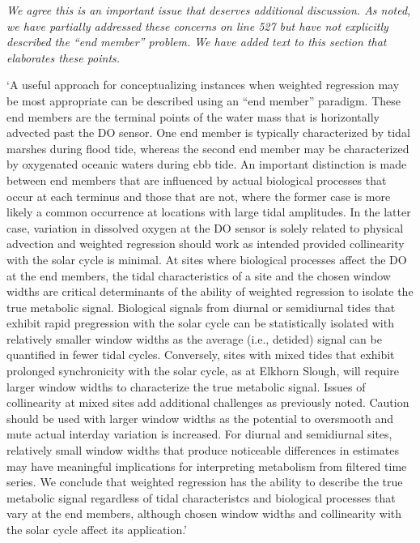 \documentclass[letterpaper,12pt]{article}\usepackage[]{graphicx}\usepackage[]{color}
\begin{document}
{\it We agree this is an important issue that deserves additional discussion.  As noted, we have partially addressed these concerns on line 527 but have not explicitly described the ``end member'' problem.  We have added text to this section that elaborates these points. 

`A useful approach for conceptualizing instances when weighted regression may be most appropriate can be described using an ``end member'' paradigm.  These end members are the terminal points of the water mass that is horizontally advected past the DO sensor.  One end member is typically characterized by tidal marshes during flood tide, whereas the second end member may be characterized by oxygenated oceanic waters during ebb tide.  An important distinction is made between end members that are influenced by actual biological processes that occur at each terminus and those that are not, where the former case is more likely a common occurrence at locations with large tidal amplitudes.  In the latter case, variation in dissolved oxygen at the DO sensor is solely related to physical advection and weighted regression should work as intended provided collinearity with the solar cycle is minimal.  At sites where biological processes affect the DO at the end members, the tidal characteristics of a site and the chosen window widths are critical determinants of the ability of weighted regression to isolate the true metabolic signal.  Biological signals from diurnal or semidiurnal tides that exhibit rapid pregression with the solar cycle can be statistically isolated with relatively smaller window widths as the average (i.e., detided) signal can be quantified in fewer tidal cycles.  Conversely, sites with mixed tides that exhibit prolonged synchronicity with the solar cycle, as at Elkhorn Slough, will require larger window widths to characterize the true metabolic signal.  Issues of collinearity at mixed sites add additional challenges as previously noted.  Caution should be used with larger window widths as the potential to oversmooth and mute actual interday variation is increased.  For diurnal and semidiurnal sites, relatively small window widths that produce noticeable differences in estimates may have meaningful implications for interpreting metabolism from filtered time series.  We conclude that weighted regression has the ability to describe the true metabolic signal regardless of tidal characteristcs and biological processes that vary at the end members, although chosen window widths and collinearity with the solar cycle affect its application.'
}
\end{document}
